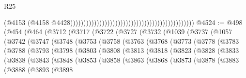 \begin{lexlean}{R25}
\begin{coremodule}
                                                                                              (@4153
                                                                                                (@4158
                                                                                                  @4428)))))))))))))))))))))))))))))))))))))))))))))))
@4524 := @498
    (@454
      (@464
        (@3712
          (@3717
            (@3722
              (@3727
                (@3732
                  (@1039
                    (@3737
                      (@1057
                        (@3742
                          (@3747
                            (@3748
                              (@3753
                                (@3758
                                  (@3763
                                    (@3768
                                      (@3773
                                        (@3778
                                          (@3783
                                            (@3788
                                              (@3793
                                                (@3798
                                                  (@3803
                                                    (@3808
                                                      (@3813
                                                        (@3818
                                                          (@3823
                                                            (@3828
                                                              (@3833
                                                                (@3838
                                                                  (@3843
                                                                    (@3848
                                                                      (@3853
                                                                        (@3858
                                                                          (@3863
                                                                            (@3868
                                                                              (@3873
                                                                                (@3878
                                                                                  (@3883
                                                                                    (@3888
                                                                                      (@3893
                                                                                        (@3898

\end{coremodule}
\end{lexlean}
